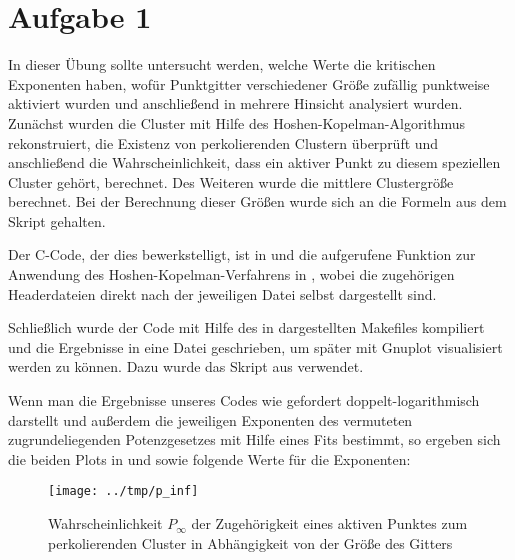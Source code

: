 \section*{Aufgabe 1}
In dieser Übung sollte untersucht werden, welche Werte die kritischen Exponenten
haben, wofür Punktgitter verschiedener Größe zufällig punktweise aktiviert wurden
und anschließend in mehrere Hinsicht analysiert wurden. Zunächst wurden die Cluster
mit Hilfe des Hoshen-Kopelman-Algorithmus rekonstruiert, die Existenz
von perkolierenden Clustern überprüft und anschließend die Wahrscheinlichkeit, dass
ein aktiver Punkt zu diesem speziellen Cluster gehört, berechnet. Des Weiteren
wurde die mittlere Clustergröße berechnet. Bei der Berechnung dieser Größen wurde
sich an die Formeln aus dem Skript gehalten.

Der C-Code, der dies bewerkstelligt, ist in  und die aufgerufene
Funktion zur Anwendung des Hoshen-Kopelman-Verfahrens in , wobei die zugehörigen Headerdateien 
direkt nach der jeweiligen Datei selbst dargestellt sind.




% 
% 

Schließlich wurde der Code mit Hilfe des in  dargestellten Makefiles
kompiliert und die Ergebnisse in eine Datei geschrieben, um später mit Gnuplot
visualisiert werden zu können. Dazu wurde das Skript aus  verwendet.




Wenn man die Ergebnisse unseres Codes wie gefordert doppelt-logarithmisch darstellt
und außerdem die jeweiligen Exponenten des vermuteten zugrundeliegenden Potenzgesetzes
mit Hilfe eines Fits bestimmt, so ergeben sich die beiden Plots in  und
 sowie folgende Werte für die Exponenten:

\begin{figure}[htb]
  \centering
  \texttt{[image: ../tmp/p\_inf]}
  \caption{Wahrscheinlichkeit $P_{\infty}$ der Zugehörigkeit eines aktiven Punktes zum perkolierenden Cluster in Abhängigkeit von der Größe des Gitters}
  \label{fig:P}
\end{figure}

